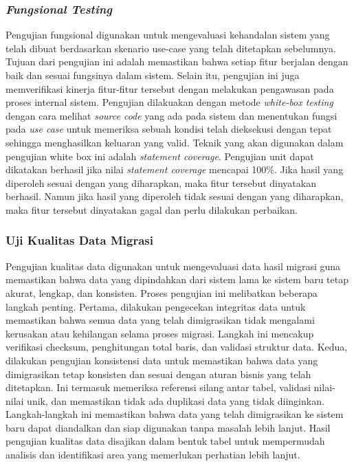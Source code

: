 \subsubsection{\emph{Fungsional Testing}}
Pengujian fungsional digunakan untuk mengevaluasi kehandalan sistem yang telah dibuat berdasarkan skenario use-case yang telah ditetapkan sebelumnya. Tujuan dari pengujian ini adalah memastikan bahwa setiap fitur berjalan dengan baik dan sesuai fungsinya dalam sistem. Selain itu, pengujian ini juga memverifikasi kinerja fitur-fitur tersebut dengan melakukan pengawasan pada proses internal sistem. Pengujian dilakuakan dengan metode \emph{white-box testing} dengan cara melihat \emph{source code} yang ada pada sistem dan menentukan fungsi pada \emph{use case} untuk memeriksa sebuah kondisi telah dieksekusi dengan tepat sehingga menghasilkan keluaran yang valid. Teknik yang akan digunakan dalam pengujian white box ini adalah \emph{statement coverage}. Pengujian unit dapat dikatakan berhasil jika nilai \emph{statement coverage} mencapai 100\%. Jika hasil yang diperoleh sesuai dengan yang diharapkan, maka fitur tersebut dinyatakan berhasil. Namun jika hasil yang diperoleh tidak sesuai dengan yang diharapkan, maka fitur tersebut dinyatakan gagal dan perlu dilakukan perbaikan.

\subsubsection{Uji Kualitas Data Migrasi}
Pengujian kualitas data digunakan untuk mengevaluasi data hasil migrasi guna memastikan bahwa data yang dipindahkan dari sistem lama ke sistem baru tetap akurat, lengkap, dan konsisten. Proses pengujian ini melibatkan beberapa langkah penting. Pertama, dilakukan pengecekan integritas data untuk memastikan bahwa semua data yang telah dimigrasikan tidak mengalami kerusakan atau kehilangan selama proses migrasi. Langkah ini mencakup verifikasi checksum, penghitungan total baris, dan validasi struktur data. Kedua, dilakukan pengujian konsistensi data untuk memastikan bahwa data yang dimigrasikan tetap konsisten dan sesuai dengan aturan bisnis yang telah ditetapkan. Ini termasuk memeriksa referensi silang antar tabel, validasi nilai-nilai unik, dan memastikan tidak ada duplikasi data yang tidak diinginkan. Langkah-langkah ini memastikan bahwa data yang telah dimigrasikan ke sistem baru dapat diandalkan dan siap digunakan tanpa masalah lebih lanjut. Hasil pengujian kualitas data disajikan dalam bentuk tabel untuk mempermudah analisis dan identifikasi area yang memerlukan perhatian lebih lanjut.


